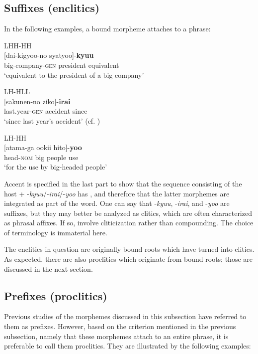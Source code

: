 \documentclass[output=paper]{LSP/langsci}
\begin{document}
\subsection{Suffixes (enclitics)}\label{sec:nishiyama:4.2}
   

In the following examples, a bound morpheme attaches to a phrase:

\ea\label{ex:nishiyama:34}
 \ea        
\glll \hfill{}   LHH-HH\\
    {[}dai-kigyoo-no    syatyoo]-\textbf{kyuu}  \\
     big-company-\textsc{gen} {president equivalent}\\
\glt ‘equivalent to the president of a big company’    \citep[327]{Kageyama1993}

  \ex
\glll \hfill{}        LH-HLL\\
    {[}sakunen-no   ziko]-\textbf{irai}\\
     last.year-\textsc{gen} accident since\\
\glt ‘since last year’s accident’            (cf. \citealt[131]{Kubozono1995})

  \ex         
\glll \hfill{} {} LH-HH\\
{[}atama-ga ookii hito]-\textbf{yoo}\\
 head-\textsc{nom} big people use\\
\glt ‘for the use by big-headed people’
\z \z

Accent is specified in the last part to show that the sequence consisting of the host + -\textit{kyuu}/-\textit{irai}/-\textit{yoo} has , and therefore that the latter morphemes are integrated as part of the word. One can say that -\textit{kyuu}, -\textit{irai}, and -\textit{yoo} are suffixes, but they may better be analyzed as clitics, which are often characterized as phrasal affixes. If so,  involve cliticization rather than compounding. The choice of terminology is immaterial here.

The enclitics in question are originally  bound roots which have turned into clitics. As expected, there are also proclitics which originate from  bound roots; those are discussed in the next section.

\subsection{Prefixes (proclitics)}\label{sec:nishiyama:4.3}
  

Previous studies of the morphemes discussed in this subsection \citep{Poser1990,Kageyama2001,Kageyama2009} have referred to them as prefixes. However, based on the criterion mentioned in the previous subsection, namely that these morphemes attach to an entire phrase, it is preferable to call them proclitics. They are illustrated by the following examples:
\end{document}
